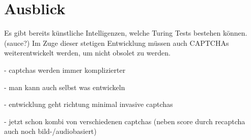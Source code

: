\chapter{Ausblick}

Es gibt bereits künstliche Intelligenzen, welche Turing Tests bestehen können. (sauce?)
Im Zuge dieser stetigen Entwicklung müssen auch CAPTCHAs weiterentwickelt werden,
um nicht obsolet zu werden. 

- captchas werden immer komplizierter

- man kann auch selbst was entwickeln

- entwicklung geht richtung minimal invasive captchas 

- jetzt schon kombi von verschiedenen captchas (neben score durch recaptcha auch noch bild-/audiobasiert)